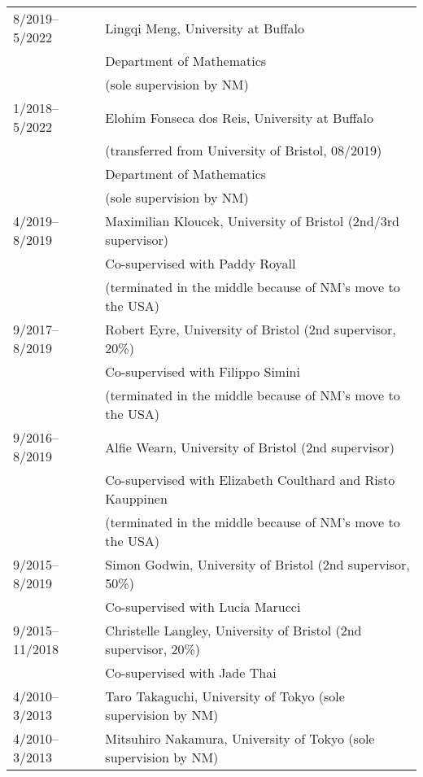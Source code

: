 \documentclass[11pt,letter]{article}
\renewenvironment{itemize}{
  \begin{list}{}{
    \setlength{\leftmargin}{1.5em}
    \setlength{\itemsep}{0.25em}
    \setlength{\parskip}{0pt}
    \setlength{\parsep}{0.25em}
  }
}{
  \end{list}
}
\begin{document}
\begin{itemize}
\begin{tabular}{ll}
8/2019--5/2022 & Lingqi Meng, University at Buffalo\\
& Department of Mathematics\\
& (sole supervision by NM)\\[1.5mm]
%
1/2018--5/2022 & Elohim Fonseca dos Reis, University at Buffalo\\ & (transferred from University of Bristol, 08/2019)\\
& Department of Mathematics\\
& (sole supervision by NM)\\[1.5mm]
%
4/2019--8/2019 & Maximilian Kloucek, University of Bristol (2nd/3rd supervisor)\\
& Co-supervised with Paddy Royall\\
& (terminated in the middle because of NM's move to the USA)\\[1.5mm]
%
9/2017--8/2019 & Robert Eyre, University of Bristol (2nd supervisor, 20\%)\\
& Co-supervised with Filippo Simini\\
& (terminated in the middle because of NM's move to the USA)\\[1.5mm]
%
9/2016--8/2019 & Alfie Wearn, University of Bristol (2nd supervisor)\\
& Co-supervised with Elizabeth Coulthard and Risto Kauppinen\\[1.5mm]
& (terminated in the middle because of NM's move to the USA)\\[1.5mm]
%
9/2015--8/2019 & Simon Godwin, University of Bristol (2nd supervisor, 50\%)\\
& Co-supervised with Lucia Marucci\\[1.5mm]
%
9/2015--11/2018 & Christelle Langley, University of Bristol (2nd supervisor, 20\%)\\
& Co-supervised with Jade Thai\\[1.5mm]
%
4/2010--3/2013 & Taro Takaguchi, University of Tokyo (sole supervision by NM)
\\[1.5mm]
%
4/2010--3/2013 & Mitsuhiro Nakamura, University of Tokyo (sole supervision by NM)
\end{tabular}


\end{itemize}
\end{document}
